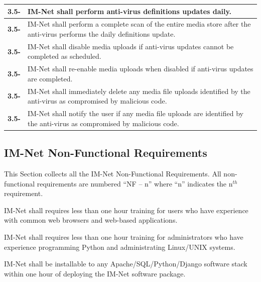 \documentclass[letterpaper,12pt]{article}
\newcounter{qcounter}							%
\newcounter{rcounter}							%
\newcommand\rnumber{\stepcounter{rcounter}\arabic{rcounter}}
\begin{document}
{\begin{center}
\begin{tabular}{|l|p{6in}|}
\hline
\textbf{3.5-\rnumber} & IM-Net shall perform anti-virus definitions updates daily.\\ 
\hline
\textbf{3.5-\rnumber} & IM-Net shall perform a complete scan of the entire media store after the anti-virus performs the daily definitions update.\\ 
\hline
\textbf{3.5-\rnumber} & IM-Net shall disable media uploads if anti-virus updates cannot be completed as scheduled. \\ 
\hline 
\textbf{3.5-\rnumber} & IM-Net shall re-enable media uploads when disabled if anti-virus updates are completed. \\ 
\hline
\textbf{3.5-\rnumber} & IM-Net shall immediately delete any media file uploads identified by the anti-virus as compromised by malicious code. \\ 
\hline
\textbf{3.5-\rnumber} & IM-Net shall notify the user if any media file uploads are identified by the anti-virus as compromised by malicious code. \\ 
\hline
\end{tabular} 
\end{center}

\textcolor{subsection}{\subsection{IM-Net Non-Functional Requirements}}

This Section collects all the IM-Net Non-Functional Requirements. All non-functional requirements are numbered ``NF -- n'' where ``n'' indicates the n${}^{th}$ requirement.

\begin{list}{NF -- :~}{}

\item  IM-Net shall requires less than one hour training for users who have experience with common web browsers and web-based applications.

\item  IM-Net shall requires less than one hour training for administrators who have experience programming Python and administrating Linux/UNIX systems.

\item  IM-Net shall be installable to any Apache/SQL/Python/Django software stack within one hour of deploying the IM-Net software package.

\end{list}

}
\end{document}
